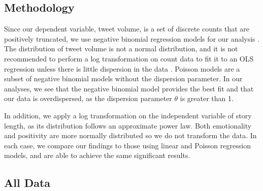 \documentclass[letterpaper]{article}
\begin{document}
\subsection{Methodology}

Since our dependent variable, tweet volume, is a set of discrete counts that are positively truncated, we use negative binomial regression models for our analysis \cite{scott1997regression}. The distribution of tweet volume is not a normal distribution, and it is not recommended to perform a log transformation on count data to fit it to an OLS regression unless there is little dispersion in the data \cite{o2010not}. Poisson models are a subset of negative binomial models without the dispersion parameter. In our analyses, we see that the negative binomial model provides the best fit and that our data is overdispersed, as the dispersion parameter $\theta$ is greater than 1.   

In addition, we apply a log transformation on the independent variable of story length, as its distribution follows an approximate power law. Both emotionality and positivity are more normally distributed so we do not transform the data.
In each case, we compare our findings to those using linear and Poisson regression models, and are able to achieve the same significant results. 




\subsection{All Data}
\end{document}
